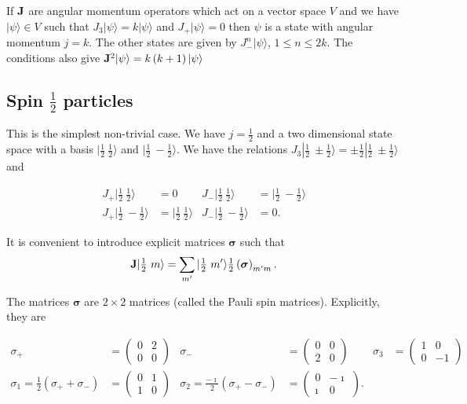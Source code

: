 \documentclass{notes}
\newcommand{\ket}[1]{|#1\rangle}
\newcommand{\sv}{\boldsymbol{\sigma}}
\begin{document}
If $\mathbf{J}$ are angular momentum operators which act on a vector
space $V$ and we have $\ket{\psi} \in V$ such that $J_3 \ket{\psi}
= k \ket{\psi}$ and $J_+ \ket{\psi} = 0$ then $\psi$ is
a state with angular momentum $j = k$.  The other states are given by
$J_-^n \ket{\psi}$, $1 \le n \le 2 k$.  The conditions also give
$\vect{J}^2 \ket{\psi} = k \left( k + 1 \right) \ket{\psi}$

\subsection{Spin $\frac{1}{2}$ particles}

This is the simplest non-trivial case.  We have $j = \frac{1}{2}$ and
a two dimensional state space with a basis $\ket{\frac{1}{2}\ \frac{1}{2}}$
and $\ket{\frac{1}{2}\ -\frac{1}{2}}$.  We have the relations
$J_3 \ket{\tfrac{1}{2}\ \pm \tfrac{1}{2}} = \pm \frac{1}{2}
\ket{\tfrac{1}{2}\ \pm \tfrac{1}{2}}$ and

\begin{align*}
J_+ \ket{\tfrac{1}{2}\ \tfrac{1}{2}} &= 0  &
J_- \ket{\tfrac{1}{2}\ \tfrac{1}{2}} &= \ket{\tfrac{1}{2}\
-\tfrac{1}{2}} \\
J_+ \ket{\tfrac{1}{2}\ -\tfrac{1}{2}} &= \ket{\tfrac{1}{2}\ 
\tfrac{1}{2}}
& J_- \ket{\tfrac{1}{2}\ -\tfrac{1}{2}} &= 0.
\end{align*}

It is convenient to introduce explicit matrices $\sv$ such that
\[
\vect{J} \ket{\tfrac{1}{2}\ m} = \sum_{m'} \ket{\tfrac{1}{2}\ m'}
\tfrac{1}{2} \left( \sv \right)_{m' m}.
\]

The matrices $\sv$ are $2 \times 2$ matrices (called the Pauli spin
matrices).  Explicitly, they are

\begin{align*}
\sigma_+ &= \begin{pmatrix} 0 & 2 \\ 0 & 0 \end{pmatrix} &
\sigma_- &= \begin{pmatrix} 0 & 0 \\ 2 & 0 \end{pmatrix} &
\sigma_3 &= \begin{pmatrix} 1 & 0 \\ 0 & -1 \end{pmatrix} \\
\sigma_1 = \frac{1}{2} \left( \sigma_+ + \sigma_-\right) &=
\begin{pmatrix} 0 & 1 \\ 1 & 0 \end{pmatrix} &
\sigma_2 = \frac{-\imath}{2} \left( \sigma_+ - \sigma_- \right) &=
\begin{pmatrix} 0 & -\imath \\ \imath & 0 \end{pmatrix}.
\end{align*}
\end{document}
